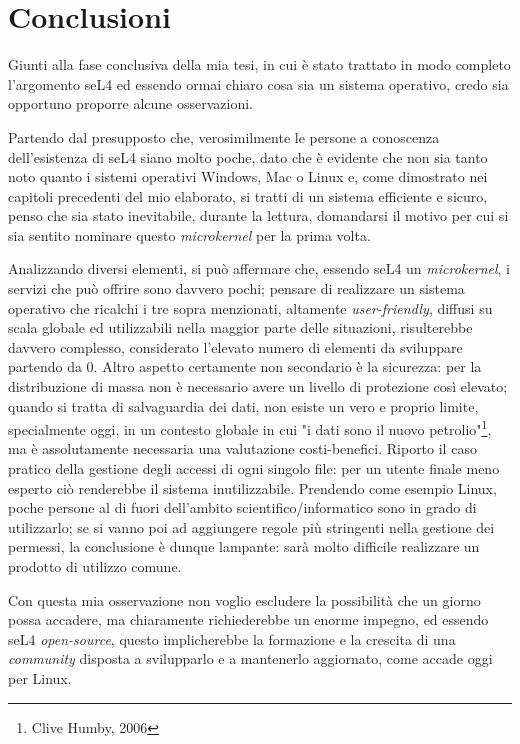 \chapter{Conclusioni}
Giunti alla fase conclusiva della mia tesi, in cui è stato trattato in modo completo l'argomento seL4 ed essendo ormai chiaro cosa sia un sistema operativo, credo sia opportuno proporre alcune osservazioni.

Partendo dal presupposto che, verosimilmente le persone a conoscenza dell'esistenza di seL4 siano molto poche, dato che è evidente che non sia tanto noto quanto i sistemi operativi Windows, Mac o Linux e, come dimostrato nei capitoli precedenti del mio elaborato, si tratti di un sistema efficiente e sicuro, penso che sia stato inevitabile, durante la lettura, domandarsi il motivo per cui si sia sentito nominare questo \textit{microkernel} per la prima volta.

Analizzando diversi elementi, si può affermare che, essendo seL4 un \textit{microkernel}, i servizi che può offrire sono davvero pochi; pensare di realizzare un sistema operativo che ricalchi i tre sopra menzionati, altamente \textit{user-friendly}, diffusi su scala globale ed utilizzabili nella maggior parte delle situazioni, risulterebbe davvero complesso, considerato l'elevato numero di elementi da sviluppare partendo da 0. Altro aspetto certamente non secondario è la sicurezza: per la distribuzione di massa non è necessario avere un livello di protezione così elevato; quando si tratta di salvaguardia dei dati, non esiste un vero e proprio limite, specialmente oggi, in un contesto globale in cui "i dati sono il nuovo petrolio"\footnote{Clive Humby, 2006}, ma è assolutamente necessaria una valutazione costi-benefici. Riporto il caso pratico della gestione degli accessi di ogni singolo file: per un utente finale meno esperto ciò renderebbe il sistema inutilizzabile. Prendendo come esempio Linux, poche persone al di fuori dell'ambito scientifico/informatico sono in grado di utilizzarlo; se si vanno poi ad aggiungere regole più stringenti nella gestione dei permessi, la conclusione è dunque lampante: sarà molto difficile realizzare un prodotto di utilizzo comune.

Con questa mia osservazione non voglio escludere la possibilità che un giorno possa accadere, ma chiaramente richiederebbe un enorme impegno, ed essendo seL4 \textit{open-source}, questo implicherebbe la formazione e la crescita di una \textit{community} disposta a svilupparlo e a mantenerlo aggiornato, come accade oggi per Linux.

